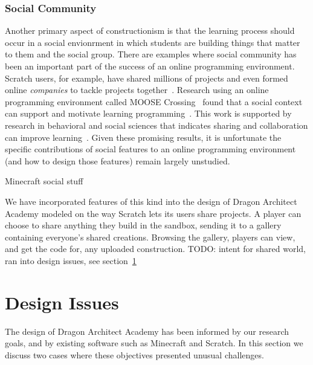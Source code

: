 \documentclass{sig-alternate}
\newcommand{\TODO}[1]{{\color{red} TODO: #1}}
\newcommand{\gametitle}{{\color{RoyalPurple} Dragon Architect Academy}}
\begin{document}
\subsubsection{Social Community}
Another primary aspect of constructionism is that the learning process should occur in a social envionrment in which students are building things that matter to them and the social group.
There are examples where social community has been an important part of the success of an online programming environment. 
Scratch users, for example, have shared millions of projects and even formed online \emph{companies} to tackle projects together~\cite{resnick2009scratch}. 
Research using an online programming environment called MOOSE Crossing~\cite{bruckman1997moose} found that a social context can support and motivate learning programming~\cite{bruckman2000situated}.
This work is supported by research in behavioral and social sciences that indicates sharing and collaboration can improve learning~\cite{bransford2000people}. 
Given these promising results, it is unfortunate the specific contributions of social features to an online programming environment (and how to design those features) remain largely unstudied.

Minecraft social stuff

We have incorporated features of this kind into the design of \gametitle{} modeled on the way Scratch lets its users share projects. 
A player can choose to share anything they build in the sandbox, sending it to a gallery containing everyone's shared creations.
Browsing the gallery, players can view, and get the code for, any uploaded construction.
\TODO{intent for shared world, ran into design issues, see section~\ref{}}

\section{Design Issues}
The design of \gametitle{} has been informed by our research goals, and by existing software such as Minecraft and Scratch. 
In this section we discuss two cases where these objectives presented unusual challenges. 
\end{document}
